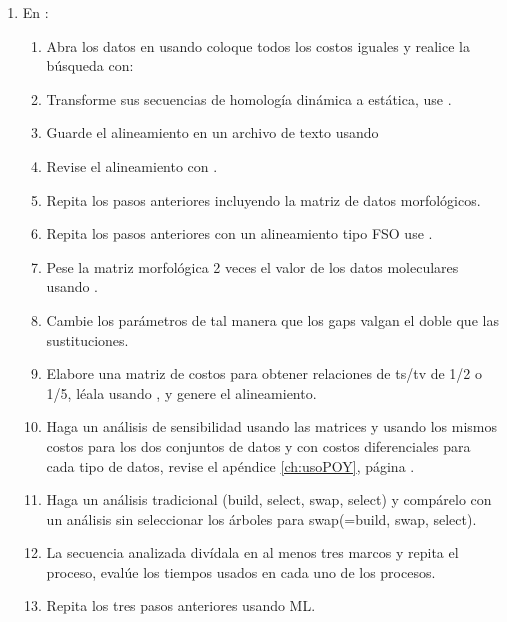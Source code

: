 \begin{enumerate}
	\item En :
		\begin{enumerate}
	  	 \item  Abra los datos en  usando 
	  	 coloque todos los costos iguales y realice la b\'usqueda con: 
		 \item Transforme sus secuencias de homolog\'ia din\'amica a est\'atica, use .
		 \item Guarde el alineamiento en un archivo de texto usando 
		 \item Revise el alineamiento con .
		 \item Repita los pasos anteriores incluyendo la matriz de datos morfol\'ogicos.
		 \item Repita los pasos anteriores con un alineamiento tipo FSO use .
		 \item Pese la matriz morfol\'ogica 2 veces el valor de los datos moleculares usando .
		 \item Cambie los par\'ametros de tal manera que los gaps valgan el doble que las sustituciones.
		 \item Elabore una matriz de costos para obtener relaciones de ts/tv de  1/2 o  1/5, l\'eala usando , y genere el alineamiento.
		 \item Haga un an\'alisis de sensibilidad usando las matrices  y  usando los mismos costos para los dos conjuntos de datos y con costos diferenciales para cada tipo de datos, revise el ap\'endice \ref{ch:usoPOY}, p\'agina \pageref{ch:usoPOY}.
		 \item Haga un an\'alisis tradicional (build, select, swap, select) y comp\'arelo con un an\'alisis sin seleccionar los \'arboles para swap(=build, swap, select).
		 \item La secuencia analizada div\'idala en al menos tres marcos y repita el proceso, eval\'ue los tiempos usados en cada uno de los procesos.
		  \item Repita los tres pasos anteriores usando ML.


\end{enumerate}
\end{enumerate}
